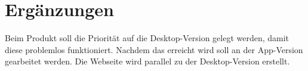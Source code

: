\section{Ergänzungen}
Beim Produkt soll die Priorität auf die Desktop-Version gelegt werden, damit diese problemlos funktioniert. Nachdem das erreicht wird soll an der App-Version gearbeitet werden. Die Webseite wird parallel zu der Desktop-Version erstellt.